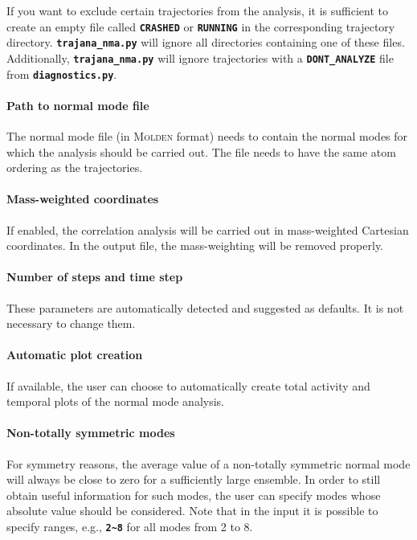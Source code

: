 \documentclass[a4paper,10pt,DIV=15,openany,twoside=false]{scrbook}
\newcommand{\ttt}[1]{\textbf{\texttt{#1}}}
\begin{document}
If you want to exclude certain trajectories from the analysis, it is sufficient to create an empty file called \ttt{CRASHED} or \ttt{RUNNING} in the corresponding trajectory directory. \ttt{trajana\_nma.py} will ignore all directories containing one of these files.
Additionally, \ttt{trajana\_nma.py} will ignore trajectories with a \ttt{DONT\_ANALYZE} file from \ttt{diagnostics.py}.

\paragraph{Path to normal mode file}

The normal mode file (in \textsc{Molden} format) needs to contain the normal modes for which the analysis should be carried out.
The file needs to have the same atom ordering as the trajectories.

\paragraph{Mass-weighted coordinates}

If enabled, the correlation analysis will be carried out in mass-weighted Cartesian coordinates.
In the output file, the mass-weighting will be removed properly.

\paragraph{Number of steps and time step}

These parameters are automatically detected and suggested as defaults.
It is not necessary to change them.

\paragraph{Automatic plot creation}

If available, the user can choose to automatically create total activity and temporal plots of the normal mode analysis.

\paragraph{Non-totally symmetric modes}

For symmetry reasons, the average value of a non-totally symmetric normal mode will always be close to zero for a sufficiently large ensemble.
In order to still obtain useful information for such modes, the user can specify modes whose absolute value should be considered.
Note that in the input it is possible to specify ranges, e.g., \ttt{2\textasciitilde8} for all modes from 2 to 8.
\end{document}
